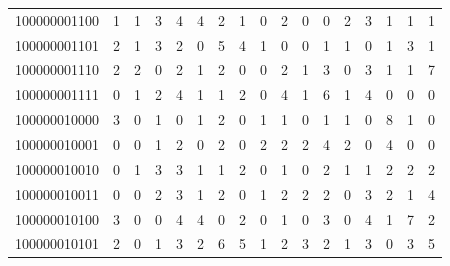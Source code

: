 \documentclass[10pt,a4paper]{article}
\begin{document}
\begin{longtable}{ |c|c|c|c|c|c|c|c|c|c|c|c|c|c|c|c|c| }
    100000001100              & 1                            & 1                                & 3                            & 4                              & 4   & 2   & 1   & 0   & 2   & 0   & 0   & 2   & 3   & 1   & 1   & 1   \\
    100000001101              & 2                            & 1                                & 3                            & 2                              & 0   & 5   & 4   & 1   & 0   & 0   & 1   & 1   & 0   & 1   & 3   & 1   \\
    100000001110              & 2                            & 2                                & 0                            & 2                              & 1   & 2   & 0   & 0   & 2   & 1   & 3   & 0   & 3   & 1   & 1   & 7   \\
    100000001111              & 0                            & 1                                & 2                            & 4                              & 1   & 1   & 2   & 0   & 4   & 1   & 6   & 1   & 4   & 0   & 0   & 0   \\
    100000010000              & 3                            & 0                                & 1                            & 0                              & 1   & 2   & 0   & 1   & 1   & 0   & 1   & 1   & 0   & 8   & 1   & 0   \\
    100000010001              & 0                            & 0                                & 1                            & 2                              & 0   & 2   & 0   & 2   & 2   & 2   & 4   & 2   & 0   & 4   & 0   & 0   \\
    100000010010              & 0                            & 1                                & 3                            & 3                              & 1   & 1   & 2   & 0   & 1   & 0   & 2   & 1   & 1   & 2   & 2   & 2   \\
    100000010011              & 0                            & 0                                & 2                            & 3                              & 1   & 2   & 0   & 1   & 2   & 2   & 2   & 0   & 3   & 2   & 1   & 4   \\
    100000010100              & 3                            & 0                                & 0                            & 4                              & 4   & 0   & 2   & 0   & 1   & 0   & 3   & 0   & 4   & 1   & 7   & 2   \\
    100000010101              & 2                            & 0                                & 1                            & 3                              & 2   & 6   & 5   & 1   & 2   & 3   & 2   & 1   & 3   & 0   & 3   & 5   \\

\end{longtable}
\end{document}
